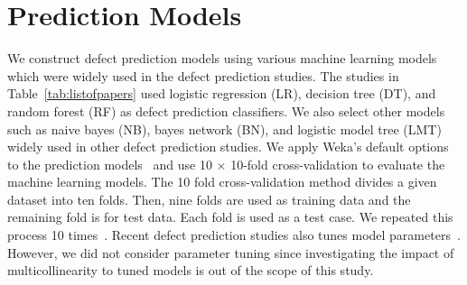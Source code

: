 \section{ Prediction Models}
\label{mls}
We construct defect prediction models using various machine learning models which were widely used in the defect prediction studies. 
The studies in Table~\ref{tab:listofpapers} used logistic regression (LR), decision tree (DT), and random forest (RF) as defect prediction classifiers. We also select other models such as naive bayes (NB), bayes network (BN), and logistic model tree (LMT) widely used in other defect prediction studies. 
We apply Weka's default options to the prediction models~\cite{Hall2009WDMWEKA} and  
use 10 $\times$ 10-fold cross-validation to evaluate the machine learning models.  
The 10 fold cross-validation method divides a given dataset into ten folds. 
Then, nine folds are used as training data and the remaining fold is for test data. Each fold is used as a test case. We repeated this process 10 times~\cite{ghotra2017msr}. Recent defect prediction studies also tunes model parameters~\cite{agrawal2020simpler, TantithamthavornICSE16Automated, Tantithamthavorn2019TSEAutomatedParameter}.
However, we did not consider parameter tuning since investigating the impact of multicollinearity to tuned models is out of the scope of this study.

